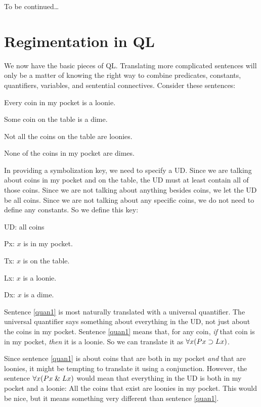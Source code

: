 \bigskip

{\Large To be continued\ldots}



\iffalse



\section{Regimentation in QL}

We now have the basic pieces of QL. Translating more complicated sentences will only be a matter of knowing the right way to combine predicates, constants, quantifiers, variables, and sentential connectives. Consider these sentences:
\begin{earg}
\item[\ex{quan1}] Every coin in my pocket is a loonie.
\item[\ex{quan2}] Some coin on the table is a dime.
\item[\ex{quan3}] Not all the coins on the table are loonies.
\item[\ex{quan4}] None of the coins in my pocket are dimes.
\end{earg}
In providing a symbolization key, we need to specify a UD. Since we are talking about coins in my pocket and on the table, the UD must at least contain all of those coins. Since we are not talking about anything besides coins, we let the UD be all coins. Since we are not talking about any specific coins, we do not need to define any constants. So we define this key:
\begin{ekey}
\item[UD:] all coins
\item[Px:] $x$ is in my pocket.
\item[Tx:] $x$ is on the table.
\item[Lx:] $x$ is a loonie.
\item[Dx:] $x$ is a dime.
\end{ekey}
Sentence \ref{quan1} is most naturally translated with a universal quantifier. The universal quantifier says something about everything in the UD, not just about the coins in my pocket. Sentence \ref{quan1} means that, for any coin, \emph{if} that coin is in my pocket, \emph{then} it is a loonie. So we can translate it as $\forall x(Px \supset Lx)$.

Since sentence \ref{quan1} is about coins that are both in my pocket \emph{and} that are loonies, it might be tempting to translate it using a conjunction. However, the sentence $\forall x(Px \mathrel\& Lx)$ would mean that everything in the UD is both in my pocket and a loonie: All the coins that exist are loonies in my pocket. This would be nice, but it means something very different than sentence \ref{quan1}.

